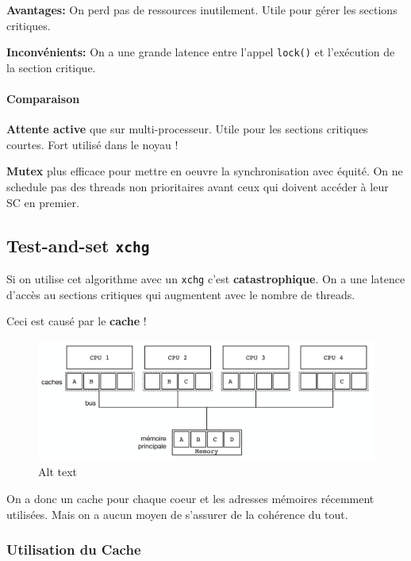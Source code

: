 \textbf{Avantages:} On perd pas de ressources inutilement. Utile pour
gérer les sections critiques.

\textbf{Inconvénients:} On a une grande latence entre l'appel
\texttt{lock()} et l'exécution de la section critique.

\paragraph{Comparaison}\label{comparaison}

\textbf{Attente active} que sur multi-processeur. Utile pour les
sections critiques courtes. Fort utilisé dans le noyau !

\textbf{Mutex} plus efficace pour mettre en oeuvre la synchronisation
avec équité. On ne schedule pas des threads non prioritaires avant ceux
qui doivent accéder à leur SC en premier.

\subsection{\texorpdfstring{Test-and-set
\texttt{xchg}}{Test-and-set xchg}}\label{test-and-set-xchg}

Si on utilise cet algorithme avec un \texttt{xchg} c'est
\textbf{catastrophique}. On a une latence d'accès au sections critiques
qui augmentent avec le nombre de threads.

Ceci est causé par le \textbf{cache} !

\begin{figure}
\centering
\includegraphics{image-28-1.png}
\caption{Alt text}
\end{figure}

On a donc un cache pour chaque coeur et les adresses mémoires récemment
utilisées. Mais on a aucun moyen de s'assurer de la cohérence du tout.

\subsubsection{Utilisation du Cache}\label{utilisation-du-cache}

